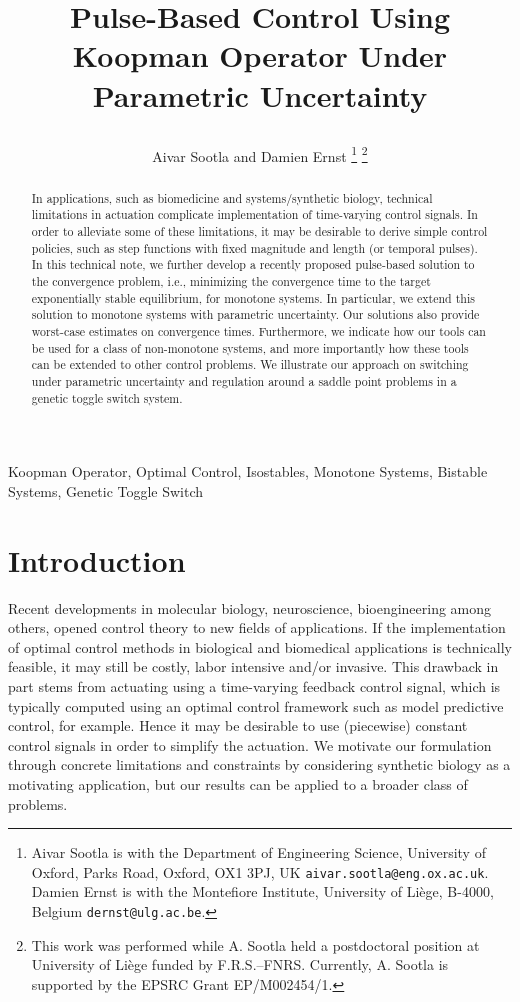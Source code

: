 \documentclass[letterpaper, 10pt, journal]{IEEEtran}  %
\title{Pulse-Based Control Using {K}oopman Operator Under Parametric Uncertainty
\author{Aivar Sootla and Damien Ernst
		\thanks{Aivar Sootla is with the Department of Engineering Science, University of Oxford, Parks Road, Oxford, OX1 3PJ, UK {\tt aivar.sootla@eng.ox.ac.uk}. Damien Ernst is with the Montefiore Institute, University of Li\`{e}ge, B-4000, Belgium {\tt dernst@ulg.ac.be}.}
		\thanks{ This work was performed while A. Sootla held a postdoctoral position at University of Li\`{e}ge funded by F.R.S.--FNRS. Currently, A. Sootla is supported by the EPSRC Grant EP/M002454/1. 
		}
	}
}
\begin{document}
\maketitle

\begin{abstract}
In applications, such as biomedicine and systems/synthetic biology, technical limitations in actuation complicate implementation of time-varying control signals. In order to alleviate some of these limitations, it may be desirable to derive simple control policies, such as step functions with fixed magnitude and length (or temporal pulses). In this technical note, we further develop a recently proposed pulse-based solution to the convergence problem, i.e., minimizing the convergence time to the target exponentially stable equilibrium, for monotone systems. In particular, we extend this solution to monotone systems with parametric uncertainty. Our solutions also provide worst-case estimates on convergence times. Furthermore, we indicate how our tools can be used for a class of non-monotone systems, and more importantly how these tools can be extended to other control problems. We illustrate our approach on switching under parametric uncertainty and regulation around a saddle point problems in a genetic toggle switch system. 
\end{abstract}

\begin{IEEEkeywords}
Koopman Operator, Optimal Control, Isostables, Monotone Systems, Bistable Systems, Genetic Toggle Switch
\end{IEEEkeywords}

\section{Introduction} 
Recent developments in molecular biology, neuroscience, bioengineering among others, opened control theory to new fields of applications. If the implementation of optimal control methods in biological and biomedical applications is technically feasible, it may still be costly, labor intensive and/or invasive. This drawback in part stems from actuating using a time-varying feedback control signal, which is typically computed using an optimal control framework such as model predictive control, for example. Hence it may be desirable to use (piecewise) constant control signals in order to simplify the actuation. We motivate our formulation through concrete limitations and constraints by considering synthetic biology as a motivating application, but our results can be applied to a broader class of problems. 
\end{document}
